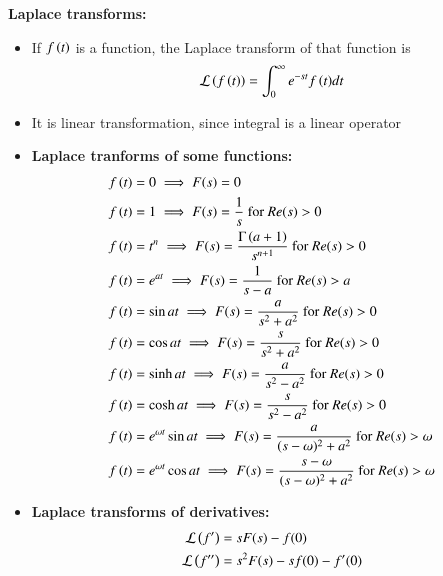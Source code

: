 \documentclass[journal]{IEEEtran}
\numberwithin{equation}{enumi}
\numberwithin{figure}{enumi}
\begin{document}
\textbf{Laplace transforms:}
\begin{itemize}
    \item If $f\left(t\right)$ is a function, the Laplace transform of that function is
\begin{align}
    \mathcal{L}\left(f\left(t\right)\right) = \int_0^{\infty}{e^{-st}f\left(t\right)}dt \label{lap}
\end{align}
    \item It is linear transformation, since integral is a linear operator 
    \item \textbf{Laplace tranforms of some functions:}
    \begin{align}
        f\left(t\right) &= 0 \implies F(s) = 0 \\
	f\left(t\right) &= 1 \implies F(s) = \frac{1}{s} \text{ for } Re(s) > 0\\
	f\left(t\right) &= t^n \implies F(s) = \frac{\Gamma\left(a+1\right)}{s^{n+1}} \text{ for } Re(s) > 0 \\
	f\left(t\right) &= e^{at} \implies F(s) = \frac{1}{s-a} \text{ for } Re(s) > a \\
	f\left(t\right) &= \sin{at} \implies F(s) = \frac{a}{s^2 + a^2} \text{ for } Re(s) > 0 \\
	f\left(t\right) &= \cos{at} \implies F(s) = \frac{s}{s^2 + a^2} \text{ for } Re(s) > 0\\
        f\left(t\right) &= \sinh{at} \implies F(s) = \frac{a}{s^2 - a^2} \text{ for } Re(s) > 0 \\
	f\left(t\right) &= \cosh{at} \implies F(s) = \frac{s}{s^2 - a^2} \text{ for } Re(s) > 0\\
        f\left(t\right) &= e^{\omega t}\sin{at} \implies F(s) = \frac{a}{(s-\omega)^2 + a^2} \text{ for } Re(s) > \omega  \\
	f\left(t\right) &= e^{\omega t}\cos{at} \implies F(s) = \frac{s - \omega}{(s-\omega)^2 + a^2} \text{ for } Re(s) > \omega 
    \end{align}
    \item \textbf{Laplace transforms of derivatives:}
    \begin{align}
			\mathcal{L} \left(f^{\prime}\right) &= s F(s) - f(0) \label{dif1} \\
			\mathcal{L} \left(f^{\prime \prime}\right) &= s^2 F(s) - s f(0) - f^{\prime}(0) \label{dif2}
    \end{align}


\end{itemize}
\end{document}
